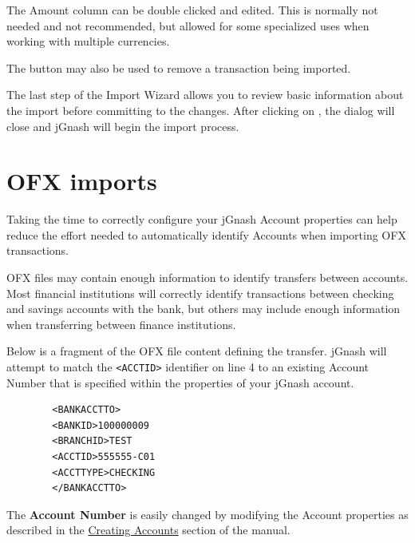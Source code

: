 \documentclass[letterpaper,12pt]{book}
\begin{document}
    The Amount column can be double clicked and edited. This is normally not
    needed and not recommended, but allowed for some specialized uses when working
    with multiple currencies.

    The  button may also be used to remove a transaction being imported.


    The last step of the Import Wizard allows you to review basic information about
    the import before committing to the changes. After clicking on ,
    the dialog will close and jGnash will begin the import process.

    \section{OFX imports}
    Taking the time to correctly configure your jGnash Account properties can help
    reduce the effort needed to automatically identify Accounts when importing OFX
    transactions.

    OFX files may contain enough information to identify transfers between accounts.
    Most financial institutions will correctly identify transactions between checking
    and savings accounts with the bank, but others may include enough information
    when transferring between finance institutions.

    Below is a fragment of the OFX file content defining the transfer. jGnash will
    attempt to match the \texttt{<ACCTID>} identifier on line 4 to an existing Account Number
    that is specified within the properties of your jGnash account.
    \\ %
    \begin{lstlisting}
        <BANKACCTTO>
        <BANKID>100000009
        <BRANCHID>TEST
        <ACCTID>555555-C01
        <ACCTTYPE>CHECKING
        </BANKACCTTO>
    \end{lstlisting}

    The \textbf{Account Number} is easily changed by modifying the Account properties as described
    in the \hyperref[subsec:creatingAccounts]{Creating Accounts} section of the manual.
\end{document}
